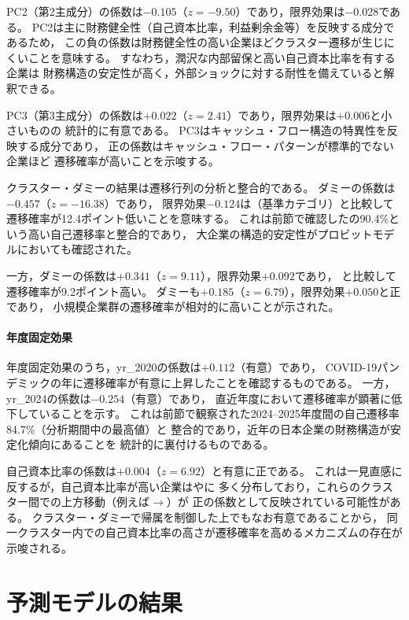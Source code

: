 PC2（第2主成分）の係数は$-0.105$（$z=-9.50$）であり，限界効果は$-0.028$である。
PC2は主に財務健全性（自己資本比率，利益剰余金等）を反映する成分であるため，
この負の係数は財務健全性の高い企業ほどクラスター遷移が生じにくいことを意味する。
すなわち，潤沢な内部留保と高い自己資本比率を有する企業は
財務構造の安定性が高く，外部ショックに対する耐性を備えていると解釈できる。

PC3（第3主成分）の係数は$+0.022$（$z=2.41$）であり，限界効果は$+0.006$と小さいものの
統計的に有意である。
PC3はキャッシュ・フロー構造の特異性を反映する成分であり，
正の係数はキャッシュ・フロー・パターンが標準的でない企業ほど
遷移確率が高いことを示唆する。

クラスター・ダミーの結果は遷移行列の分析と整合的である。
ダミーの係数は$-0.457$（$z=-16.38$）であり，
限界効果$-0.124$は（基準カテゴリ）と比較して遷移確率が12.4ポイント低いことを意味する。
これは前節で確認したの90.4\%という高い自己遷移率と整合的であり，
大企業の構造的安定性がプロビットモデルにおいても確認された。

一方，ダミーの係数は$+0.341$（$z=9.11$），限界効果$+0.092$であり，
と比較して遷移確率が9.2ポイント高い。
ダミーも$+0.185$（$z=6.79$），限界効果$+0.050$と正であり，
小規模企業群の遷移確率が相対的に高いことが示された。

\paragraph{年度固定効果}
年度固定効果のうち，yr\_2020の係数は$+0.112$（有意）であり，
COVID-19パンデミックの年に遷移確率が有意に上昇したことを確認するものである。
一方，yr\_2024の係数は$-0.254$（有意）であり，
直近年度において遷移確率が顕著に低下していることを示す。
これは前節で観察された2024--2025年度間の自己遷移率84.7\%（分析期間中の最高値）と
整合的であり，近年の日本企業の財務構造が安定化傾向にあることを
統計的に裏付けるものである。

自己資本比率の係数は$+0.004$（$z=6.92$）と有意に正である。
これは一見直感に反するが，自己資本比率が高い企業はやに
多く分布しており，これらのクラスター間での上方移動（例えば$\to$）が
正の係数として反映されている可能性がある。
クラスター・ダミーで帰属を制御した上でもなお有意であることから，
同一クラスター内での自己資本比率の高さが遷移確率を高めるメカニズムの存在が示唆される。

\section{予測モデルの結果}
\label{sec:results-prediction}


